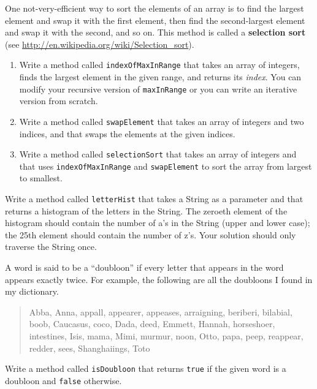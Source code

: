 \begin{exercise}
One not-very-efficient way to sort the elements of an array
is to find the largest element and swap it with the first
element, then find the second-largest element and swap it with
the second, and so on.  This method is called a {\bf selection
sort} (see \url{http://en.wikipedia.org/wiki/Selection_sort}).

\begin{enumerate}

\item Write a method called {\tt indexOfMaxInRange} that
takes an array of integers, finds the
largest element in the given range, and returns its {\em index}.
You can modify your recursive version of {\tt maxInRange} or
you can write an iterative version from scratch.

\item Write a method called {\tt swapElement} that takes an
array of integers and two indices, and that swaps the elements
at the given indices.

\item Write a method called {\tt selectionSort} that takes an array of
integers and that uses {\tt indexOfMaxInRange} and {\tt swapElement}
to sort the array from largest to smallest.

\end{enumerate}
\end{exercise}


\begin{exercise}
Write a method called {\tt letterHist} that takes a String as a
parameter and that returns a histogram of the letters in the String.
The zeroeth element of the histogram should contain the number of a's
in the String (upper and lower case); the 25th element should contain
the number of z's.
Your solution should only traverse the String once.
\end{exercise}


\begin{exercise}
A word is said to be a ``doubloon'' if every letter that appears in the
word appears exactly twice.  For example, the following are all the
doubloons I found in my dictionary.

\begin {quote}
Abba, Anna, appall, appearer, appeases, arraigning, beriberi,
bilabial, boob, Caucasus, coco, Dada, deed, Emmett, Hannah,
horseshoer, intestines, Isis, mama, Mimi, murmur, noon, Otto, papa,
peep, reappear, redder, sees, Shanghaiings, Toto
\end{quote}

Write a method called {\tt isDoubloon} that returns {\tt true}
if the given word is a doubloon and {\tt false} otherwise.
\end{exercise}


